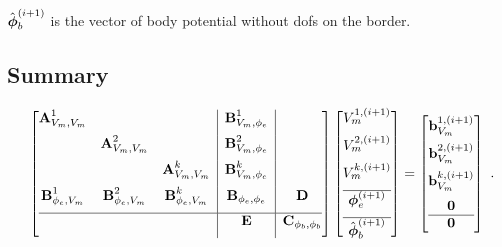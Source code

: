 $\hat{\boldsymbol{\phi}}_{b}^{(i+1)}$ is the vector of body potential without dofs on the border.

\subsection{Summary}
\begin{equation*}
  \begin{array}{lll}
    \left[\begin{array}{@{}ccc|c|c@{}}
      \bfA^1_{V_m,V_m} & & &\bfB^1_{V_m,\phi_e} & \\[2mm]
      &\bfA^2_{V_m,V_m} &  &\bfB^2_{V_m,\phi_e} & \\[2mm]
      &&\bfA^k_{V_m,V_m}  &\bfB^k_{V_m,\phi_e} & \\[2mm]
      \bfB^1_{\phi_e,V_m} & \bfB^2_{\phi_e,V_m} & \bfB^k_{\phi_e,V_m} & \bfB_{\phi_e,\phi_e} & \bfD \\[2mm] \hline
      &&&\bfE &\bfC_{\phi_b,\phi_b}\\[2mm]
    \end{array}\right]
    \left[\begin{array}{@{}c@{}}
      V_{m}^{1,(i+1)}  \\[2mm]
      V_{m}^{2,(i+1)}  \\[2mm]
      V_{m}^{k,(i+1)}  \\[2mm]\hline 
      \bfphi_{e}^{(i+1)} \\[2mm]\hline
      \hat{\bfphi}_{b}^{(i+1)}
    \end{array}\right]
    = 
    \left[\begin{array}{@{}c@{}}
      \bfb_{V_m}^{1,(i+1)} \\[2mm]
      \bfb_{V_m}^{2,(i+1)} \\[2mm]
      \bfb_{V_m}^{k,(i+1)} \\[2mm]
      \bfzero\\\hline
      \bfzero
    \end{array}\right]
  \end{array}.
\end{equation*}




\newpage
\nocite{*}
{}


%


